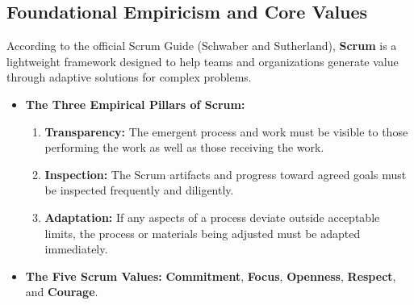 \subsection{Foundational Empiricism and Core Values}
According to the official Scrum Guide (Schwaber and Sutherland), \textbf{Scrum} is a lightweight framework designed to help teams and organizations generate value through adaptive solutions for complex problems.
\begin{itemize}
    \item \textbf{The Three Empirical Pillars of Scrum:}
    \begin{enumerate}
        \item \textbf{Transparency:} The emergent process and work must be visible to those performing the work as well as those receiving the work.
        \item \textbf{Inspection:} The Scrum artifacts and progress toward agreed goals must be inspected frequently and diligently.
        \item \textbf{Adaptation:} If any aspects of a process deviate outside acceptable limits, the process or materials being adjusted must be adapted immediately.
    \end{enumerate}
    \item \textbf{The Five Scrum Values:} \textbf{Commitment}, \textbf{Focus}, \textbf{Openness}, \textbf{Respect}, and \textbf{Courage}.
\end{itemize}

